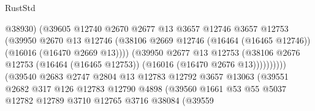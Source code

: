 \begin{lexlean}{RustStd}
\begin{coremodule}
                                          @38930)
                                        (@39605
                                          @12740
                                          @2670
                                          @2677
                                          @13
                                          @3657
                                          @12746
                                          @3657
                                          @12753
                                          (@39950
                                            @2670
                                            @13
                                            @12746
                                            (@38106
                                              @2669
                                              @12746
                                              (@16464 (@16465 @12746))
                                              (@16016 (@16470 @2669 @13))))
                                          (@39950
                                            @2677
                                            @13
                                            @12753
                                            (@38106
                                              @2676
                                              @12753
                                              (@16464 (@16465 @12753))
                                              (@16016 (@16470 @2676 @13))))))))))
                              (@39540
                                @2683
                                @2747
                                @2804
                                @13
                                @12783
                                @12792
                                @3657
                                @13063
                                (@39551
                                  @2682
                                  @317
                                  @126
                                  @12783
                                  @12790
                                  @4898
                                  (@39560
                                    @1661
                                    @53
                                    @55
                                    @5037
                                    @12782
                                    @12789
                                    @3710
                                    @12765
                                    @3716
                                    @38084
                                    (@39559

\end{coremodule}
\end{lexlean}
